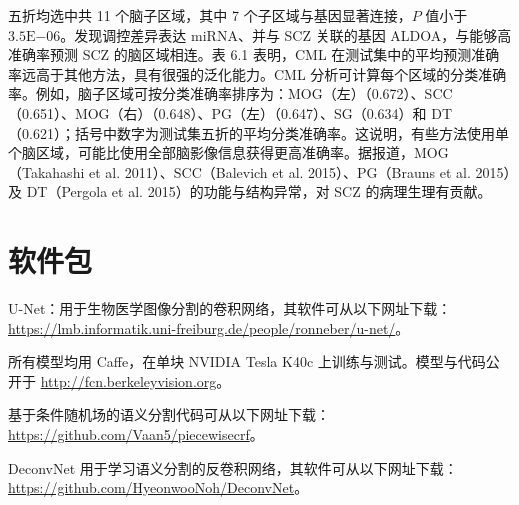 五折均选中共 11 个脑子区域，其中 7 个子区域与基因显著连接，$P$ 值小于 $3.5\mathrm{E}{-06}$。发现调控差异表达 miRNA、并与 SCZ 关联的基因 ALDOA，与能够高准确率预测 SCZ 的脑区域相连。表 6.1 表明，CML 在测试集中的平均预测准确率远高于其他方法，具有很强的泛化能力。CML 分析可计算每个区域的分类准确率。例如，脑子区域可按分类准确率排序为：MOG（左）（0.672）、SCC（0.651）、MOG（右）（0.648）、PG（左）（0.647）、SG（0.634）和 DT（0.621）；括号中数字为测试集五折的平均分类准确率。这说明，有些方法使用单个脑区域，可能比使用全部脑影像信息获得更高准确率。据报道，MOG（Takahashi et al. 2011）、SCC（Balevich et al. 2015）、PG（Brauns et al. 2015）及 DT（Pergola et al. 2015）的功能与结构异常，对 SCZ 的病理生理有贡献。

\section*{软件包}

U-Net：用于生物医学图像分割的卷积网络，其软件可从以下网址下载：
\url{https://lmb.informatik.uni-freiburg.de/people/ronneber/u-net/}。

所有模型均用 Caffe，在单块 NVIDIA Tesla K40c 上训练与测试。模型与代码公开于
\url{http://fcn.berkeleyvision.org}。

基于条件随机场的语义分割代码可从以下网址下载：
\url{https://github.com/Vaan5/piecewisecrf}。

DeconvNet 用于学习语义分割的反卷积网络，其软件可从以下网址下载：
\url{https://github.com/HyeonwooNoh/DeconvNet}。
